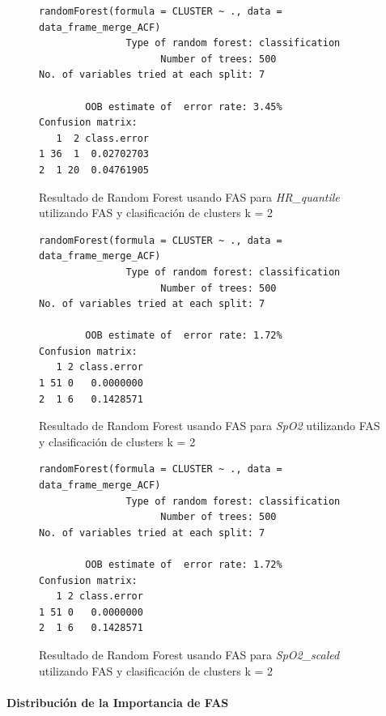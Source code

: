 \begin{figure}[H]
    \centering
    \begin{lstlisting}[frame=single, basicstyle=\small\ttfamily]
        randomForest(formula = CLUSTER ~ ., data = data_frame_merge_ACF) 
               Type of random forest: classification
                     Number of trees: 500
No. of variables tried at each split: 7

        OOB estimate of  error rate: 3.45%
Confusion matrix:
   1  2 class.error
1 36  1  0.02702703
2  1 20  0.04761905
    \end{lstlisting}
    \caption{Resultado de Random Forest usando FAS para \textit{HR\_quantile} utilizando FAS y clasificación de clusters k = 2}
    \label{fig:random_forest_acf_result_RF_3}
\end{figure}

\begin{figure}[H]
    \centering
    \begin{lstlisting}[frame=single, basicstyle=\small\ttfamily]
        randomForest(formula = CLUSTER ~ ., data = data_frame_merge_ACF) 
               Type of random forest: classification
                     Number of trees: 500
No. of variables tried at each split: 7

        OOB estimate of  error rate: 1.72%
Confusion matrix:
   1 2 class.error
1 51 0   0.0000000
2  1 6   0.1428571
    \end{lstlisting}
    \caption{Resultado de Random Forest usando FAS para \textit{SpO2} utilizando FAS y clasificación de clusters k = 2}\label{fig:random_forest_acf_result_RF_4}
\end{figure}
\begin{figure}[H]
    \centering
    \begin{lstlisting}[frame=single, basicstyle=\small\ttfamily]
        randomForest(formula = CLUSTER ~ ., data = data_frame_merge_ACF) 
               Type of random forest: classification
                     Number of trees: 500
No. of variables tried at each split: 7

        OOB estimate of  error rate: 1.72%
Confusion matrix:
   1 2 class.error
1 51 0   0.0000000
2  1 6   0.1428571
    \end{lstlisting}
    \caption{Resultado de Random Forest usando FAS para \textit{SpO2\_scaled} utilizando FAS y clasificación de clusters k = 2}
    \label{fig:random_forest_acf_result_RF_5}
\end{figure}

\paragraph{Distribución de la Importancia de FAS}


